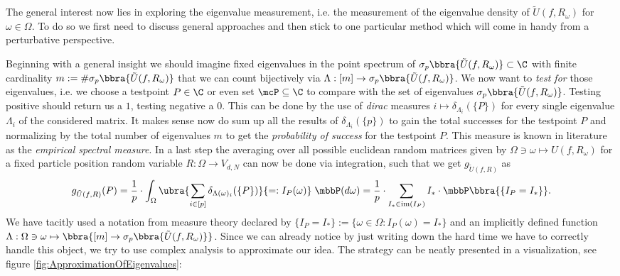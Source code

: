 The general interest now lies in exploring the eigenvalue measurement, i.e. the measurement of the eigenvalue density of $\tilde U(f,R_\omega)$ for $\omega\in\Omega$. To do so we first need to discuss general approaches and then stick to one particular method which will come in handy from a perturbative perspective. 

Beginning with a general insight we should imagine fixed eigenvalues in the point spectrum of $\sigma_p\bbra{\tilde U(f,R_\omega)}\subset\C$ with finite cardinality $m:=\#\sigma_p\bbra{\tilde U(f,R_\omega)}$ that we can count bijectively via $\Lambda:[m]\to\sigma_p\bbra{\tilde U(f,R_\omega)}$. We now want to \emph{test for} those eigenvalues, i.e. we choose a testpoint $P\in\C$ or even set $\mcP\subseteq\C$ to compare with the set of eigenvalues $\sigma_p\bbra{\tilde U(f,R_\omega)}$. Testing positive should return us a $1$, testing negative a $0$. This can be done by the use of \emph{dirac} measures $i\mapsto\delta_{\Lambda_i}(\{P\})$ for every single eigenvalue $\Lambda_i$ of the considered matrix. It makes sense now do sum up all the results of $\delta_{\Lambda_i}(\{p\})$ to gain the total successes for the testpoint $P$ and normalizing by the total number of eigenvalues $m$ to get the \emph{probability of success} for the testpoint $P$. This measure is known in literature \cite{meckes2021eigenvaluesrandommatrices} as the \emph{empirical spectral measure}. In a last step the averaging over all possible euclidean random matrices given by $\Omega\ni\omega\mapsto U(f,R_\omega)$ for a fixed particle position random variable $R:\Omega\to V_{d,N}$ can now be done via integration, such that we get $g_{\tilde U(f,R)}$ as 
\begin{align}
    g_{\tilde U(f,R)}(P) = \frac{1}{p}\cdot\int_{\Omega}\ubra{\sum_{i\in[p]}\delta_{\Lambda(\omega)_i}(\{P\})}{=:I_P(\omega)}\;\mbbP(d\omega) = \frac{1}{p}\cdot\sum_{I_*\in\text{im}(I_P)}I_*\cdot\mbbP\bbra{\{I_P = I_*\}}. \label{eq:EmpiricalSpectralMeasure}
\end{align}
We have tacitly used a notation from measure theory declared by $\{I_P = I_*\} := \{\omega\in\Omega:I_P(\omega) = I_*\}$ and an implicitly defined function $\Lambda:\Omega\ni\omega\mapsto\bbra{[m]\to\sigma_p\bbra{\tilde U(f,R_\omega)}}$. Since we can already notice by just writing down the hard time we have to correctly handle this object, we try to use complex analysis to approximate our idea. The strategy can be neatly presented in a visualization, see figure \ref{fig:ApproximationOfEigenvalues}:
